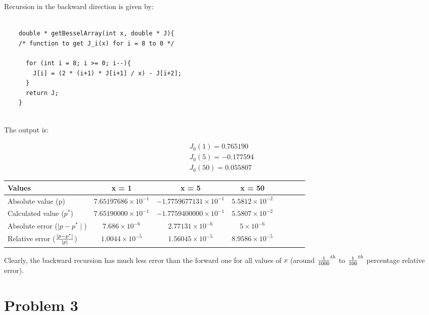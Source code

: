 \documentclass[12pt,letterpaper]{article}
\begin{document}
Recursion in the backward direction is given by:



    
    \lstset{language=C++}
    \begin{lstlisting}[style = C]
	
	double * getBesselArray(int x, double * J){
	/* function to get J_i(x) for i = 8 to 0 */

	  for (int i = 8; i >= 0; i--){
	    J[i] = (2 * (i+1) * J[i+1] / x) - J[i+2];
	  }
	  return J;
	}
	

    \end{lstlisting}

The output is:

\begin{align}
J_{0}(1) = 0.765190 \\
J_{0}(5) = -0.177594 \\
J_{0}(50) = 0.055807
\end{align}


\begin{center}
\begin{tabular}{l*{6}{c}r}
\hline
Values 	            	& x = 1 & x = 5 & x = 50\\
\hline
Absolute value (p) 								& $7.65197686 \times 10^{-1}$ 	& $-1.7759677131 \times 10^{-1}$ 	& $5.5812 \times 10^{-2}$  \\
Calculated value ($p^*$)        						& $7.65190000 \times 10^{-1}$ 	& $-1.7759400000 \times 10^{-1}$	& $5.5807 \times 10^{-2}$ \\
Absolute error ($\mid p - p^* \mid$)          				& $7.686 \times 10^{-6}$		& $2.77131 \times 10^{-6}$		& $5 \times 10^{-6}$ \\
\hline
Relative error ($\mid p - p^* \mid \over \mid p \mid$)    	& $1.0044 \times 10^{-5}$ 	& $1.56045 \times 10^{-5}$		& $8.9586 \times 10^{-5}$ \\
\hline
\end{tabular}
\end{center}

Clearly, the backward recursion has much less error than the forward one for all values of $x$ (around ${1 \over 1000}^{th}$ to ${1 \over 100}^{th}$ percentage relative error).


\newpage
\section*{Problem 3}
\end{document}
